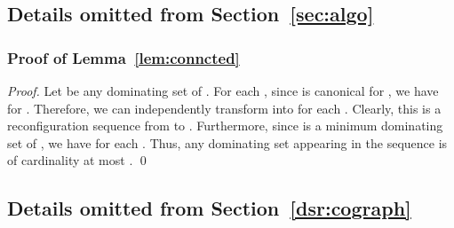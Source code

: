 \documentclass{llncs}
\begin{document}
\subsection{Details omitted from Section~\ref{sec:algo}}
\subsubsection{Proof of Lemma~\ref{lem:conncted}}
\begin{proof}
Let  be any dominating set of .
For each , since  is
canonical for , we have  for .
 Therefore, we can independently transform  into  for each .
Clearly, this is a reconfiguration sequence from  to .
Furthermore, since  is a minimum dominating set of , we have
 for each .
Thus, any dominating set appearing in the sequence is of cardinality at most .
\qed
\end{proof}

\subsection{Details omitted from Section~\ref{dsr:cograph}}
\end{document}
